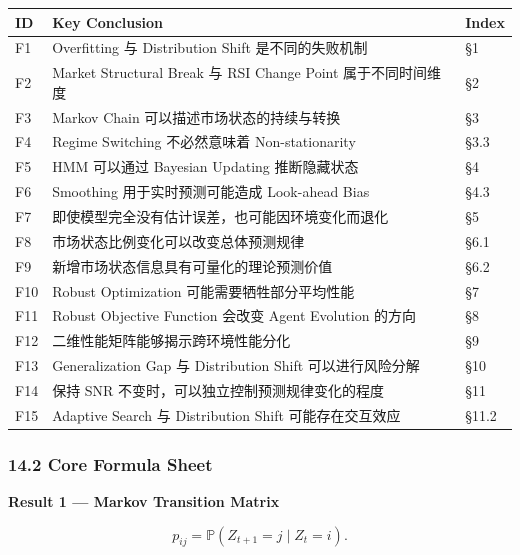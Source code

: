 \begin{readertable}
\begin{longtable}[]{@{}
  >{\raggedright\arraybackslash}p{}
  >{\raggedright\arraybackslash}p{}
  >{\raggedright\arraybackslash}p{}@{}}
\toprule
ID & Key Conclusion & Index \\
\midrule
\endhead
F1 & Overfitting 与 Distribution Shift 是不同的失败机制 & §1 \\
F2 & Market Structural Break 与 RSI Change Point 属于不同时间维度 & §2 \\
F3 & Markov Chain 可以描述市场状态的持续与转换 & §3 \\
F4 & Regime Switching 不必然意味着 Non-stationarity & §3.3 \\
F5 & HMM 可以通过 Bayesian Updating 推断隐藏状态 & §4 \\
F6 & Smoothing 用于实时预测可能造成 Look-ahead Bias & §4.3 \\
F7 & 即使模型完全没有估计误差，也可能因环境变化而退化 & §5 \\
F8 & 市场状态比例变化可以改变总体预测规律 & §6.1 \\
F9 & 新增市场状态信息具有可量化的理论预测价值 & §6.2 \\
F10 & Robust Optimization 可能需要牺牲部分平均性能 & §7 \\
F11 & Robust Objective Function 会改变 Agent Evolution 的方向 & §8 \\
F12 & 二维性能矩阵能够揭示跨环境性能分化 & §9 \\
F13 & Generalization Gap 与 Distribution Shift 可以进行风险分解 & §10 \\
F14 & 保持 SNR 不变时，可以独立控制预测规律变化的程度 & §11 \\
F15 & Adaptive Search 与 Distribution Shift 可能存在交互效应 & §11.2 \\
\bottomrule
\end{longtable}
\end{readertable}

\hypertarget{part-4-77-0001-core-formula-sheet}{%
\subsubsection{14.2 Core Formula Sheet}\label{part-4-77-0001-core-formula-sheet}}

\textbf{Result 1 --- Markov Transition Matrix}

\[p_{ij}=\mathbb P(Z_{t+1}=j\mid Z_t=i).\]

